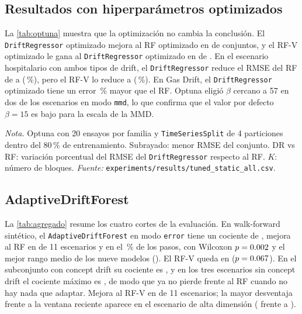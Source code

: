 \documentclass[11pt,a4paper]{article}
\newcommand{\nota}[1]{\par\smallskip\raggedright\footnotesize\textit{Nota.} #1}
\begin{document}
\subsection{Resultados con hiperparámetros optimizados}\label{sec:res-optuna}

La \cref{tab:optuna} muestra que la optimización no cambia la conclusión. El \texttt{DriftRegressor}
optimizado mejora al RF optimizado en \optDRganaRF{} de \optN{} conjuntos, y el RF-V optimizado le gana
al \texttt{DriftRegressor} optimizado en \optRFVganaDR{} de \optN{}. En el escenario hospitalario con
ambos tipos de drift, el \texttt{DriftRegressor} reduce el RMSE del RF de \optBothRF{} a \optBothDR{}
(\optBothDRpct\,\%), pero el RF-V lo reduce a \optBothRFV{} (\optBothRFVpct\,\%). En Gas Drift, el
\texttt{DriftRegressor} optimizado tiene un error \optGasDRpct\,\% mayor que el RF. Optuna eligió
$\beta$ cercano a 57 en dos de los escenarios en modo \texttt{mmd}, lo que confirma que el valor por
defecto $\beta=15$ es bajo para la escala de la MMD.

\begin{table}[htbp]
  \centering
  \caption{RMSE en test con hiperparámetros optimizados (partición 80/20)}\label{tab:optuna}
  \small
  
  \nota{Optuna con 20 ensayos por familia y \texttt{TimeSeriesSplit} de 4 particiones dentro del
  80\,\% de entrenamiento. Subrayado: menor RMSE del conjunto. DR vs RF: variación porcentual del RMSE
  del \texttt{DriftRegressor} respecto al RF. $K$: número de bloques. \textit{Fuente:}
  \texttt{experiments/results/tuned\_static\_all.csv}.}
\end{table}

\subsection{AdaptiveDriftForest}\label{sec:res-adf}

La \cref{tab:agregado} resume los cuatro cortes de la evaluación. En walk-forward sintético, el
\texttt{AdaptiveDriftForest} en modo \texttt{error} tiene un cociente de \rADFeSintWalk{}, mejora al RF
en \gADFeSintWalk{} de 11 escenarios y en el \wADFeSintWalk\,\% de los pasos, con Wilcoxon
$p=0.002$ y el mejor rango medio de los nueve modelos (\kADFeSintWalk). El RF-V queda en
\rRFVSintWalk{} ($p=0.067$). En el subconjunto con concept drift su cociente es
\hCuatroConceptGeo{}, y en los tres escenarios sin concept drift el cociente máximo es
\hCuatroSinMax{}, de modo que ya no pierde frente al RF cuando no hay nada que adaptar. Mejora al RF-V
en \hCuatroVsRFV{} de 11 escenarios; la mayor desventaja frente a la ventana reciente aparece en el
escenario de alta dimensión (\xADFeHighdimMixedWalk{} frente a \xRFVHighdimMixedWalk).
\end{document}
